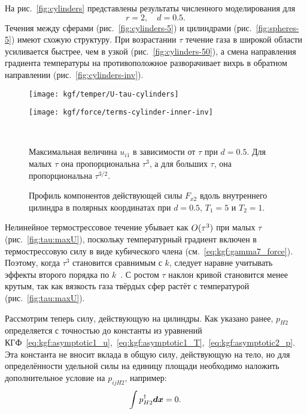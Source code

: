 На рис.~\ref{fig:cylinders} представлены результаты численного моделирования для
\[ r = 2, \quad d = 0.5. \]
Течения между сферами (рис.~\ref{fig:cylinders-5}) и цилиндрами (рис.~\ref{fig:spheres-5}) имеют схожую структуру.
При возрастании \(\tau\) течение газа в широкой области усиливается быстрее, чем в узкой (рис.~\ref{fig:cylinders-50}),
а смена направления градиента температуры на противоположное разворачивает вихрь
в обратном направлении (рис.~\ref{fig:cylinders-inv}).

\begin{figure}[ht]
    \parbox[t]{0.48\linewidth}{%
        \centering
        \texttt{[image: kgf/temper/U-tau-cylinders]}
    }\hfill
    \parbox[t]{0.48\linewidth}{%
        \centering
        \texttt{[image: kgf/force/terms-cylinder-inner-inv]}
    }\\[-6pt]
    \parbox[t]{0.48\linewidth}{%
        \caption{Максимальная величина \(u_{i1}\) в зависимости от \(\tau\) при \(d=0.5\).
            Для малых \(\tau\) она пропорциональна \(\tau^3\), а для больших \(\tau\), она пропорциональна \(\tau^{3/2}\).}
        \label{fig:tau:maxU}
    }\hfill
    \parbox[t]{0.48\linewidth}{%
        \caption{Профиль компонентов действующей силы \(F_{x2}\) вдоль
            внутреннего цилиндра в полярных координатах при \(d=0.5\), \(T_1 = 5\) и \(T_2 = 1\).}
        \label{fig:terms:inner-swap}
    }
\end{figure}

Нелинейное термострессовое течение убывает как \(O(\tau^3)\) при малых \(\tau\) (рис.~\ref{fig:tau:maxU}),
поскольку температурный градиент включен в термострессовую силу в виде кубического члена (см.~\eqref{eq:kgf:gamma7_force}).
Поэтому, когда \(\tau^3\) становится сравнимым с \(k\), следует наравне учитывать эффекты
второго порядка по \(k\)~\cite{Sone1989Noncoaxial}.
С ростом \(\tau\) наклон кривой становится менее крутым,
так как вязкость газа твёрдых сфер растёт с температурой (рис.~\ref{fig:tau:maxU}).

Рассмотрим теперь силу, действующую на цилиндры.
Как указано ранее, \(p_{H2}\) определяется с точностью до константы
из уравнений КГФ~\eqref{eq:kgf:asymptotic1_u},~\eqref{eq:kgf:asymptotic1_T},~\eqref{eq:kgf:asymptotic2_p}.
Эта константа не вносит вклада в общую силу, действующую на тело,
но для определённости удельной силы на единицу площади необходимо наложить дополнительное условие
на \(p_{ijH2}\), например:
\begin{equation}\label{eq:dag_condition}
    \int p_{H2}^\dag\boldsymbol{d{x}} = 0.
\end{equation}

